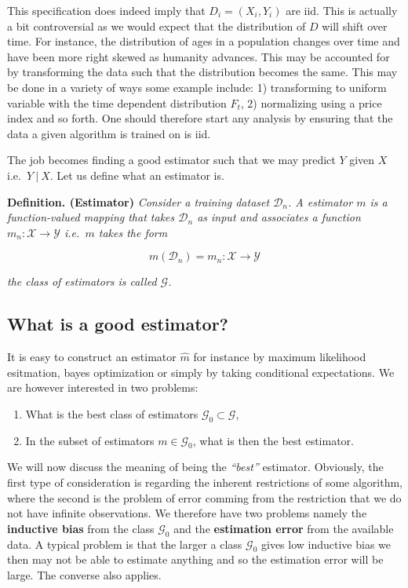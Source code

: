 \documentclass[a4paper,12pt,openany]{book}
\providecommand{\tightlist}{%
 \setlength{\itemsep}{0pt}\setlength{\parskip}{0pt}}
\begin{document}
This specification does indeed imply that \(D_i=(X_i,Y_i)\) are iid. This is actually a bit controversial as we would expect that the distribution of \(D\) will shift over time. For instance, the distribution of ages in a population changes over time and have been more right skewed as humanity advances. This may be accounted for by transforming the data such that the distribution becomes the same. This may be done in a variety of ways some example include: 1) transforming to uniform variable with the time dependent distribution \(F_t\), 2) normalizing using a price index and so forth. One should therefore start any analysis by ensuring that the data a given algorithm is trained on is iid.

The job becomes finding a good estimator such that we may predict \(Y\) given \(X\) i.e.~\(Y\ \vert\ X\). Let us define what an estimator is.

\textbf{Definition. (Estimator)} \emph{Consider a training dataset \(\mathcal{D}_n\). A estimator \(m\) is a function-valued mapping that takes \(\mathcal{D}_n\) as input and associates a function \(m_n : \mathcal{X}\to \mathcal{Y}\) i.e.~\(m\) takes the form}

\[
m(\mathcal{D}_n)=m_n:\mathcal{X}\to \mathcal{Y}
\]

\emph{the class of estimators is called \(\mathcal{G}\).}

\hypertarget{what-is-a-good-estimator}{%
\subsection{What is a good estimator?}\label{what-is-a-good-estimator}}

It is easy to construct an estimator \(\hat{m}\) for instance by maximum likelihood esitmation, bayes optimization or simply by taking conditional expectations. We are however interested in two problems:

\begin{enumerate}
\def\labelenumi{\arabic{enumi}.}
\tightlist
\item
  What is the best class of estimators \(\mathcal{G}_0\subset\mathcal{G}\),
\item
  In the subset of estimators \(m \in \mathcal{G}_0\), what is then the best estimator.
\end{enumerate}

We will now discuss the meaning of being the \emph{``best''} estimator. Obviously, the first type of consideration is regarding the inherent restrictions of some algorithm, where the second is the problem of error comming from the restriction that we do not have infinite observations. We therefore have two problems namely the \textbf{inductive bias} from the class \(\mathcal{G}_0\) and the \textbf{estimation error} from the available data. A typical problem is that the larger a class \(\mathcal{G}_0\) gives low inductive bias we then may not be able to estimate anything and so the estimation error will be large. The converse also applies.
\end{document}
